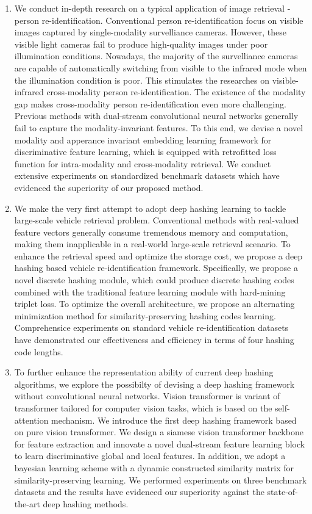 \begin{abstract*}
\begin{enumerate}
  \item We conduct in-depth research on a typical application of image retrieval - person re-identification. Conventional person re-identification focus on visible images captured by single-modality survelliance cameras. However, these visible light cameras fail to produce high-quality images under poor illumination conditions. Nowadays, the majority of the survelliance cameras are capable of automatically switching from visible to the infrared mode when the illumination condition is poor. This stimulates the researches on visible-infrared cross-modality person re-identification. The existence of the modality gap makes cross-modality person re-identification even more challenging. Previous methods with dual-stream convolutional neural networks generally fail to capture the modality-invariant features. To this end, we devise a novel modality and apperance invariant embedding learning framework for discriminative feature learning, which is equipped with retrofitted loss function for intra-modality and cross-modality retrieval. We conduct extensive experiments on standardized benchmark datasets which have evidenced the superiority of our proposed method.
  \item We make the very first attempt to adopt deep hashing learning to tackle large-scale vehicle retrieval problem. Conventional methods with real-valued feature vectors generally consume tremendous memory and computation, making them inapplicable in a real-world large-scale retrieval scenario. To enhance the retrieval speed and optimize the storage cost, we propose a deep hashing based vehicle re-identification framework.  Specifically, we propose a novel discrete hashing module, which could produce discrete hashing codes combined with the traditional feature learning module with hard-mining triplet loss. To optimize the overall architecture, we propose an alternating minimization method for similarity-preserving hashing codes learning.  Comprehensice experiments on standard vehicle re-identification datasets have demonstrated our effectiveness and efficiency in terms of four hashing code lengths.
  \item To further enhance the representation ability of current deep hashing algorithms, we explore the possibilty of devising a deep hashing framework without convolutional neural networks. Vision transformer is variant of transformer tailored for computer vision tasks, which is based on the self-attention mechanism. We introduce the first deep hashing framework based on pure vision transformer. We design a siamese vision transformer backbone for feature extraction and innovate a novel dual-stream feature learning block to learn discriminative global and local features. In addition, we adopt a bayesian learning scheme with a dynamic constructed similarity matrix for similarity-preserving learning. We performed experiments on three benchmark datasets and the results have evidenced our superiority against the state-of-the-art deep hashing methods.

\end{enumerate}
\end{abstract*}
